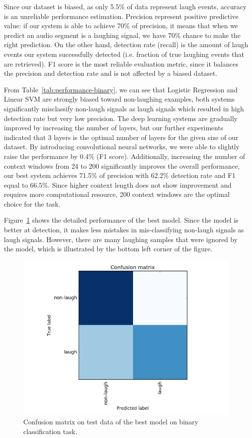 \documentclass[10pt,journal,compsoc]{IEEEtran}
\begin{document}
Since our dataset is biased, as only 5.5\% of data represent laugh events, accuracy is an unreliable performance estimation. Precision represent positive predictive value: if our system is able to achieve 70\% of precision, it means that when we predict an audio segment is a laughing signal, we have 70\% chance to make the right prediction. On the other hand, detection rate (recall) is the amount of laugh events our system successfully detected (i.e. fraction of true laughing events that are retrieved). F1 score is the most reliable evaluation metric, since it balances the precision and detection rate and is not affected by a biased dataset.

From Table~\ref{tab:performance-binary}, we can see that Logistic Regression and Linear SVM are strongly biased toward non-laughing examples, both systems significantly misclassify non-laugh signals as laugh signals which resulted in high detection rate but very low precision. The deep learning systems are gradually improved by increasing the number of layers, but our further experiments indicated that 3 layers is the optimal number of layers for the given size of our dataset. By introducing convolutional neural networks, we were able to slightly raise the performance by 0.4\% (F1 score). Additionally, increasing the number of context windows from 24 to 200 significantly improves the overall performance, our best system achieves 71.5\% of precision with 62.2\% detection rate and F1 equal to 66.5\%. Since higher context length does not show improvement and requires more computational resource, 200 context windows are the optimal choice for the task.

Figure~\ref{fig:confusion-matrix-binary} shows the detailed performance of the best model. Since the model is better at detection, it makes less mistakes in mis-classifying non-laugh signals as laugh signals. However, there are many laughing samples that were ignored by the model, which is illustrated by the bottom left corner of the figure.

\begin{figure}[htb]
\centering
\includegraphics[width=1\linewidth]{images/ConfusionMatrix-Binary.png}
\caption{Confusion matrix on test data of the best model on binary classification task.}
\label{fig:confusion-matrix-binary}
\end{figure}
\end{document}
